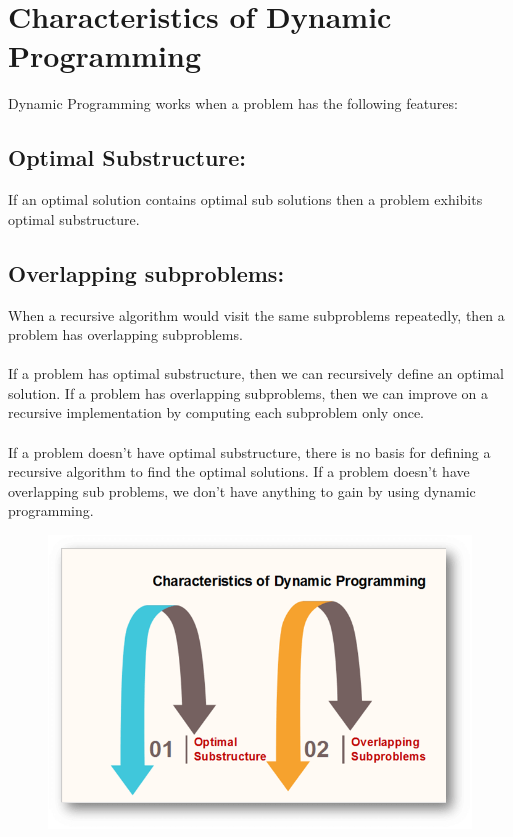 \documentclass[11pt]{article}
\begin{document}
\section*{Characteristics of Dynamic Programming}

Dynamic Programming works when a problem has the following features:\\
\subsection*{Optimal Substructure:} If an optimal solution contains optimal sub solutions then a problem exhibits optimal substructure.

\subsection*{Overlapping subproblems:} When a recursive algorithm would visit the same subproblems repeatedly, then a problem has overlapping subproblems.\\

\paragraph*{} If a problem has optimal substructure, then we can recursively define an optimal solution. If a problem has overlapping subproblems, then we can improve on a recursive implementation by computing each subproblem only once.
\paragraph*{}If a problem doesn't have optimal substructure, there is no basis for defining a recursive algorithm to find the optimal solutions. If a problem doesn't have overlapping sub problems, we don't have anything to gain by using dynamic programming.
\begin{figure}
\includegraphics[width=.8\textwidth]{1.png}
\end{figure}
\end{document}
